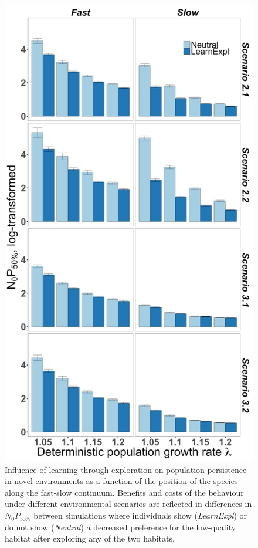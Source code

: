 \begin{figure}
\centering
\includegraphics[height=.75\textheight]{./Figures/Appendix3_2/Fig_8.jpg}
\caption[Effects of \textit{LearnExpl} on $N_{0}P_{50\%}$]{
Influence of learning through exploration on population persistence in novel
environments as a function of the position of the species along the fast-slow
continuum. Benefits and costs of the behaviour under different environmental
scenarios are reflected in differences in $N_{0}P_{50\%}$ between simulations
where individuals show (\emph{LearnExpl}) or do not show (\emph{Neutral}) a
decreased preference for the low-quality habitat after exploring any of the two
habitats.}
\label{fig:figApp3.2.8}
\end{figure}

